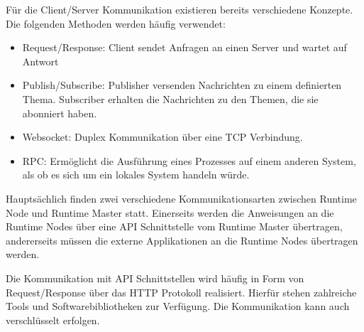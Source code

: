 Für die Client/Server Kommunikation existieren bereits verschiedene Konzepte. Die folgenden Methoden werden häufig verwendet:

\begin{itemize}
    \item Request/Response: Client sendet Anfragen an einen Server und wartet auf Antwort
    \item Publish/Subscribe: Publisher versenden Nachrichten zu einem definierten Thema. Subscriber erhalten die Nachrichten zu den Themen, die sie abonniert haben.
    \item Websocket: Duplex Kommunikation über eine \gls{TCP} Verbindung. 
    \item \gls{RPC}: Ermöglicht die Ausführung eines Prozesses auf einem anderen System, als ob es sich um ein lokales System handeln würde.
\end{itemize}

Hauptsächlich finden zwei verschiedene Kommunikationsarten zwischen Runtime Node und Runtime Master statt. Einerseits werden die Anweisungen an die Runtime Nodes über eine \gls{API} Schnittstelle vom Runtime Master übertragen, andererseits müssen die externe Applikationen an die Runtime Nodes übertragen werden. 

Die Kommunikation mit \gls{API} Schnittstellen wird häufig in Form von Request/Response über das HTTP Protokoll realisiert. Hierfür stehen zahlreiche Tools und Softwarebibliotheken zur Verfügung. Die Kommunikation kann auch verschlüsselt erfolgen. 

